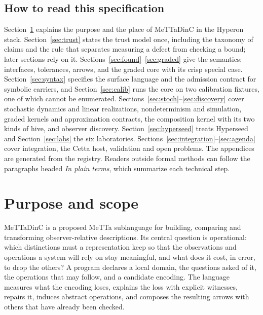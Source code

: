 \documentclass[11pt]{article}
\theoremstyle{definition}
\theoremstyle{plain}
\begin{document}
\subsection*{How to read this specification}
Section~\ref{sec:intro} explains the purpose and the place of MeTTaDinC in the Hyperon stack.
Section~\ref{sec:trust} states the trust model once, including the taxonomy of claims and the
rule that separates measuring a defect from checking a bound; later sections rely on it.
Sections~\ref{sec:found}--\ref{sec:graded} give the semantics: interfaces, tolerances, arrows,
and the graded core with its crisp special case. Section~\ref{sec:syntax} specifies the surface
language and the admission contract for symbolic carriers, and Section~\ref{sec:calib} runs the
core on two calibration fixtures, one of which cannot be enumerated.
Sections~\ref{sec:stoch}--\ref{sec:discovery} cover stochastic dynamics and linear realizations,
nondeterminism and simulation, graded kernels and approximation contracts, the composition kernel
with its two kinds of hive, and observer discovery. Section~\ref{sec:hyperseed} treats Hyperseed and
Section~\ref{sec:labs} the six laboratories. Sections~\ref{sec:integration}--\ref{sec:agenda} cover
integration, the Cetta host, validation and open problems. The appendices are generated from the
registry. Readers outside formal methods can follow the paragraphs headed \emph{In plain terms},
which summarize each technical step.

\tableofcontents
\clearpage

\section{Purpose and scope}\label{sec:intro}

MeTTaDinC is a proposed MeTTa sublanguage for building, comparing and transforming
observer-relative descriptions. Its central question is operational: which distinctions must a
representation keep so that the observations and operations a system will rely on stay
meaningful, and what does it cost, in error, to drop the others? A program declares a local
domain, the questions asked of it, the operations that may follow, and a candidate encoding.
The language measures what the encoding loses, explains the loss with explicit witnesses,
repairs it, induces abstract operations, and composes the resulting arrows with others that
have already been checked.
\end{document}
